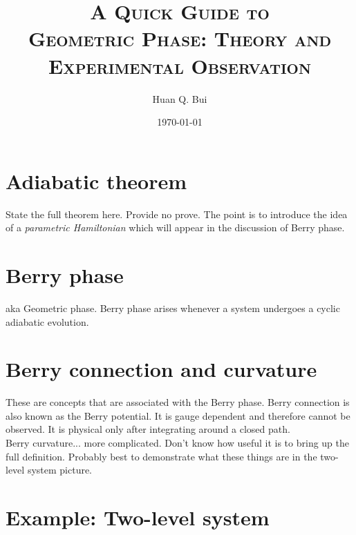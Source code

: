 \documentclass{article}
\theoremstyle{definition}
\begin{document}
	\begin{titlepage}\centering
		\clearpage
		\title{\textsc{\bf{A Quick Guide to \\ Geometric Phase: Theory and Experimental Observation}}}
		\author{\bigskip Huan Q. Bui}
		\date{\today}
		\maketitle
		\thispagestyle{empty}
	\end{titlepage}




\newpage
\tableofcontents
\newpage




\section{Adiabatic theorem}

State the full theorem here. Provide no prove. The point is to introduce the idea of a \textit{parametric Hamiltonian} which will appear in the discussion of Berry phase. 

\section{Berry phase}

aka Geometric phase. Berry phase arises whenever a system undergoes a cyclic adiabatic evolution. 


\section{Berry connection and curvature}

These are concepts that are associated with the Berry phase. Berry connection is also known as the Berry potential. It is gauge dependent and therefore cannot be observed. It is physical only after integrating around a closed path. \\


Berry curvature... more complicated. Don't know how useful it is to bring up the full definition. Probably best to demonstrate what these things are in the two-level system picture. 



\section{Example: Two-level system}
\end{document}
